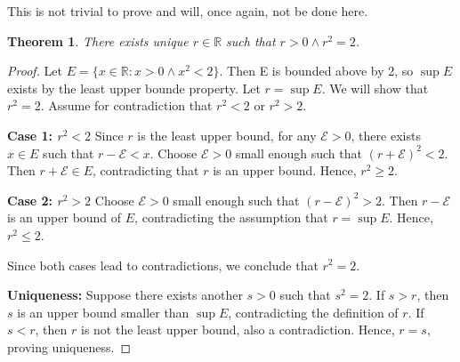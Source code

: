 \documentclass[12pt]{article}
\newtheorem{theorem}{Theorem}
\begin{document}
\noindent 
This is not trivial to prove and will, once again, not be done here.

\begin{theorem}
    There exists unique \(r \in \mathbb R\) such that \(r > 0 \land r^2 = 2\). 
\end{theorem}
\begin{proof}
    Let \(E = \{x\in \mathbb R : x > 0 \land x^2 < 2\}\). Then E is bounded above 
    by 2, so \(\sup E \) exists by the least upper bounde property.
    Let \(r = \sup E\). We will show that \(r^2 = 2\). 
    Assume for contradiction that \(r^2 < 2\) or \(r^2 > 2\).
    
    \noindent
    \textbf{Case 1: \(r^2 < 2\) }
    Since \(r\) is the least upper bound, for any \(\mathcal E > 0\), 
    there exists \(x \in E\) such that \(r - \mathcal E < x\).  
    Choose \(\mathcal E > 0\) small enough such that \( (r + \mathcal E)^2 < 2 \).  
    Then \(r + \mathcal E \in E\), contradicting that \(r\) is an upper bound.  
    Hence, \(r^2 \geq 2\).
    
    \noindent
    \textbf{Case 2: \(r^2 > 2\)}
    Choose \(\mathcal E > 0\) small enough such that \( (r - \mathcal E)^2 > 2 \).  
    Then \(r - \mathcal E\) is an upper bound of \(E\), 
    contradicting the assumption that \(r = \sup E\).  
      Hence, \(r^2 \leq 2\).
    
    \noindent 
    Since both cases lead to contradictions, we conclude that \(r^2 = 2\).
    
    \noindent 
    \textbf{Uniqueness:} 
    Suppose there exists another \(s > 0\) such that \(s^2 = 2\).  
    If \(s > r\), then \(s\) is an upper bound smaller than \(\sup E\), 
    contradicting the definition of \(r\).  
    If \(s < r\), then \(r\) is not the least upper bound, also a contradiction.  
    Hence, \(r = s\), proving uniqueness.
\end{proof}
\end{document}
